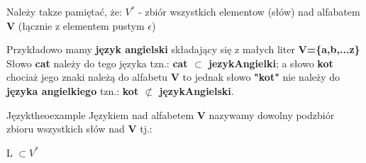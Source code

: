 	Należy takze pamiętać, że:
	 $V^{*}$ - zbiór wszystkich elementow (słów) nad alfabatem 
	 { \bf V} (łącznie z elementem pustym $\epsilon$)\newline \newline
	
	\newline
	
	Przykładowo mamy \textbf{język angielski} składający się z małych liter \textbf{V=\{a,b,...z\}}
	Słowo \textbf{cat} należy do tego języka  tzn.: \textbf{ cat $\subset$ jezykAngielki}; \newline 
	a słowo \textbf{kot} chociaż jego znaki należą do alfabetu \textbf{V} to jednak słowo
	\textbf{"kot"} nie należy do \textbf{języka angielkiego} tzn.: \textbf{kot $\not\subset$
	językAngielski}.
	
	\begin{center}
	\end{center}
	
	\begin{mytheo}{Język}{theoexample}
		Językiem nad alfabetem \textbf{V} nazywamy dowolny podzbiór zbioru wszystkich słów nad
		 \textbf{V} tj.:
		\begin{center}
			L $\subset V^{*}$ 
		\end{center}
	\end{mytheo}
	

